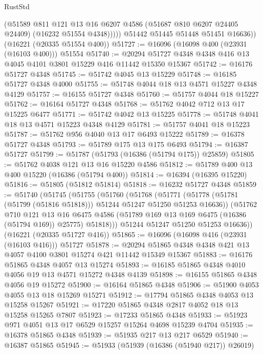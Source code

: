 \begin{lexlean}{RustStd}
\begin{coremodule}
              (@51589
                @811
                @121
                @13
                @16
                @6207
                @4586
                (@51687 @810 @6207 @24405 @24409)
                (@16232 @51554 @4348)))))
        @51442
        @51445
        @51448
        @51451
        @16636))
    (@16221 (@20335 @51554 @400))
@51727 := @16096 (@16098 @400 (@23931 (@16103 @400))) @51554
@51740 := @20294 @51727 @4348 @4348 @416 @13 @4045 @4101 @3801 @15229 @416 @11442 @15350 @15367
@51742 := @16176 @51727 @4348
@51745 := @51742 @4045 @13 @15229
@51748 := @16185 @51727 @4348 @4000
@51755 := @51748 @4044 @18 @13 @4571 @15227 @4348 @4129
@51757 := @16155 @51727 @4348
@51760 := @51757 @4044 @18 @15227
@51762 := @16164 @51727 @4348
@51768 := @51762 @4042 @712 @13 @17 @15225 @6477
@51771 := @51742 @4042 @13 @15225
@51778 := @51748 @4041 @18 @13 @4571 @15223 @4348 @4129
@51781 := @51757 @4041 @18 @15223
@51787 := @51762 @956 @4040 @13 @17 @6493 @15222
@51789 := @16378 @51727 @4348
@51793 := @51789 @175 @13 @175 @6493
@51794 := @16387 @51727
@51799 := @51787 (@51793 (@16386 (@51794 @175)) @25859)
@51805 := @51762 @4038 @121 @13 @16 @15220 @4586
@51812 := @51789 @400 @13 @400 @15220 (@16386 (@51794 @400))
@51814 := @16394 (@16395 @15220)
@51816 := @51805 (@51812 @51814)
@51818 := @16232 @51727 @4348
@51859 := @51740
    (@51745
      (@51755
        (@51760
          (@51768
            (@51771 (@51778 (@51781 (@51799 (@51816 @51818))) @51244 @51247 @51250 @51253 @16636))
            (@51762
              @710
              @121
              @13
              @16
              @6475
              @4586
              (@51789 @169 @13 @169 @6475 (@16386 (@51794 @169)) @25775)
              @51818)))
        @51244
        @51247
        @51250
        @51253
        @16636))
    (@16221 (@20335 @51727 @416))
@51865 := @16096 (@16098 @416 (@23931 (@16103 @416))) @51727
@51878 := @20294 @51865 @4348 @4348 @421 @13 @4057 @4100 @3801 @15274 @421 @11442 @15349 @15367
@51883 := @16176 @51865 @4348 @4057 @13 @15274
@51893 := @16185 @51865 @4348 @4010 @4056 @19 @13 @4571 @15272 @4348 @4139
@51898 := @16155 @51865 @4348 @4056 @19 @15272
@51900 := @16164 @51865 @4348
@51906 := @51900 @4053 @4055 @13 @18 @15269 @15271
@51912 := @17794 @51865 @4348 @4053 @13 @15258 @15267
@51921 := @17220 @51865 @4348 @2817 @4052 @18 @13 @15258 @15265 @7807
@51923 := @17233 @51865 @4348
@51933 := @51923 @971 @4051 @13 @17 @6529 @15257 @15264 @4698 @15239 @4704
@51935 := @16378 @51865 @4348
@51939 := @51935 @217 @13 @217 @6529
@51940 := @16387 @51865
@51945 := @51933 (@51939 (@16386 (@51940 @217)) @26019)

\end{coremodule}
\end{lexlean}
